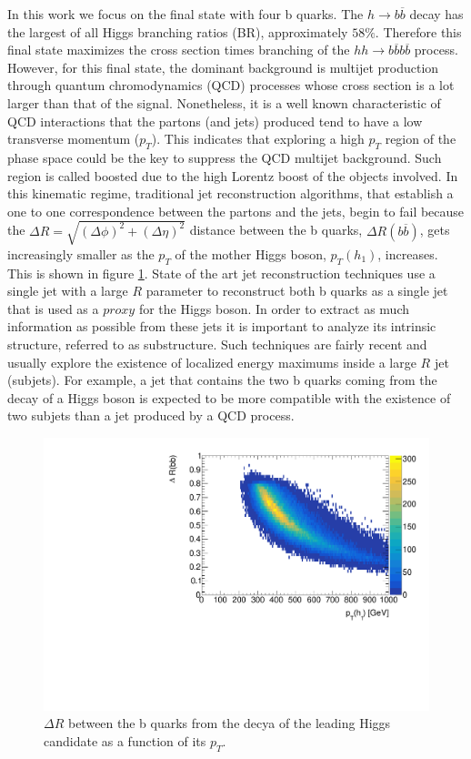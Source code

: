 In this work we focus on the final state with four b quarks. The $h\rightarrow b\overline{b}$ decay has the largest of all Higgs branching ratios (BR), approximately $58\%$. Therefore this final state maximizes the cross section times branching of the $hh\rightarrow b\overline{b}b\overline{b}$ process. However, for this final state, the dominant background is multijet production through quantum chromodynamics (QCD) processes whose cross section is a lot larger than that of the signal. Nonetheless, it is a well known characteristic of QCD interactions that the partons (and jets) produced tend to have a low transverse momentum ($p_T$). This indicates that exploring a high $p_T$ region of the phase space could be the key to suppress the QCD multijet background. Such region is called boosted due to the high Lorentz boost of the objects involved. In this kinematic regime, traditional jet reconstruction algorithms, that establish a one to one correspondence between the partons and the jets, begin to fail because the $\Delta R=\sqrt{(\Delta\phi)^2+(\Delta\eta)^2}$ distance between the b quarks, $\Delta R(b\overline{b})$, gets increasingly smaller as the $p_T$ of the mother Higgs boson, $p_T(h_1)$, increases. This is shown in figure \ref{fig:deltaRbb_pt}. State of the art jet reconstruction techniques \cite{jetsub} use a single jet with a large $R$ parameter to reconstruct both b quarks as a single jet that is used as a $\textit{proxy}$ for the Higgs boson. In order to extract as much information as possible from these jets it is important to analyze its intrinsic structure, referred to as substructure. Such techniques are fairly recent and usually explore the existence of localized energy maximums inside a large $R$ jet (subjets). For example, a jet that contains the two b quarks coming from the decay of a Higgs boson is expected to be more compatible with the existence of two subjets than a jet produced by a QCD process.

\begin{figure}[h]
	\centering
	\includegraphics[trim={.5cm 0 0 0},clip,width=\linewidth]{./images/hist_deltaR_bb_pt.pdf}
	\caption{$\Delta R$ between the b quarks from the decya of the leading Higgs candidate as a function of its $p_T$.}
	\label{fig:deltaRbb_pt}
\end{figure}

